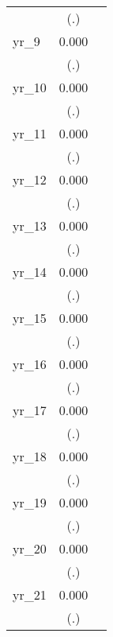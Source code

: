 \begin{table}[htbp]
\begin{tabular}{l*{2}{c}}
            &         (.)         &                     \\
yr\_9        &       0.000         &                     \\
            &         (.)         &                     \\
yr\_10       &       0.000         &                     \\
            &         (.)         &                     \\
yr\_11       &       0.000         &                     \\
            &         (.)         &                     \\
yr\_12       &       0.000         &                     \\
            &         (.)         &                     \\
yr\_13       &       0.000         &                     \\
            &         (.)         &                     \\
yr\_14       &       0.000         &                     \\
            &         (.)         &                     \\
yr\_15       &       0.000         &                     \\
            &         (.)         &                     \\
yr\_16       &       0.000         &                     \\
            &         (.)         &                     \\
yr\_17       &       0.000         &                     \\
            &         (.)         &                     \\
yr\_18       &       0.000         &                     \\
            &         (.)         &                     \\
yr\_19       &       0.000         &                     \\
            &         (.)         &                     \\
yr\_20       &       0.000         &                     \\
            &         (.)         &                     \\
yr\_21       &       0.000         &                     \\
            &         (.)         &                     \\

\end{tabular}
\end{table}
